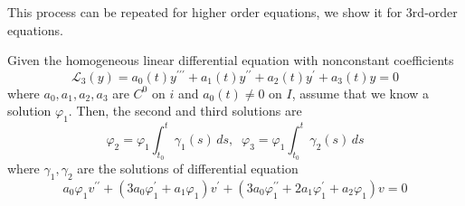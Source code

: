 \documentclass{article}
\newcounter{theorem}[section]
\begin{document}
      This process can be repeated for higher order equations, we show it for 3rd-order equations. 

      \begin{theorem}
        \label{thm:reduction-of-order-of-3rd-order-deqs}
      Given the homogeneous linear differential equation with nonconstant coefficients
      \begin{equation}
        \mathcal{L}_3 (y) = a_0 (t) y^{\prime\prime\prime} + a_1 (t) y^{\prime\prime} + a_2 (t) y^\prime + a_3 (t) y = 0
      \end{equation}
      where $a_0, a_1, a_2, a_3$ are $C^0$ on $i$ and $a_0 (t) \neq 0$ on $I$, assume that we know a solution $\varphi_1$. Then, the second and third solutions are
      \begin{equation}
        \varphi_2 = \varphi_1 \int_{t_0}^t \gamma_1(s)\,ds, \;\;\varphi_3 = \varphi_1 \int_{t_0}^t \gamma_2(s)\,ds
      \end{equation}
      where $\gamma_1, \gamma_2$ are the solutions of differential equation
      \begin{equation}
        a_0 \varphi_1 v^{\prime\prime} + (3a_0 \varphi_1^\prime + a_1 \varphi_1) v^\prime + (3 a_0 \varphi_1^{\prime\prime} + 2a_1 \varphi_1^\prime + a_2 \varphi_1) v = 0
      \end{equation}
      \end{theorem}
\end{document}
